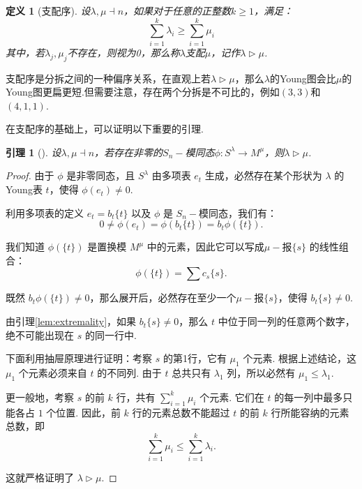 \documentclass{sjtureport}
\newtheorem{lemma}[theorem]{引理}
\newtheorem{definition}{定义}[chapter]
\begin{document}
\begin{definition}[支配序]
    设$\lambda,\mu\dashv n$，如果对于任意的正整数$k\geq 1$，满足：
    \begin{equation*}
        \sum_{i=1}^k\lambda_i\geq \sum_{i=1}^k\mu_i
    \end{equation*}
    其中，若$\lambda_j,\mu_j$不存在，则视为0，那么称$\lambda$支配$\mu$，记作$\lambda \rhd \mu$.
\end{definition}
支配序是分拆之间的一种偏序关系，在直观上若$\lambda\rhd \mu$，那么$\lambda$的Young图会比$\mu$的Young图更扁更短.但需要注意，存在两个分拆是不可比的，例如$(3,3)$和$(4,1,1)$.

在支配序的基础上，可以证明以下重要的引理.

\begin{lemma}[]
    设$\lambda,\mu\dashv n$，若存在非零的$S_n-\!\!$模同态$\phi:S^\lambda\to M^\mu$，则$\lambda\rhd \mu$.
\end{lemma}
\begin{proof}
    由于 $\phi$ 是非零同态，且 $S^\lambda$ 由多项表 $e_t$ 生成，必然存在某个形状为 $\lambda$ 的Young表 $t$，使得 $\phi(e_t) \neq 0$.
    
    利用多项表的定义 $e_t = b_t\{t\}$ 以及 $\phi$ 是 $S_n-\!$模同态，我们有：
    \begin{equation*}
        0 \neq \phi(e_t) = \phi(b_t\{t\}) = b_t\phi(\{t\}).
    \end{equation*}
    
    我们知道 $\phi(\{t\})$ 是置换模 $M^\mu$ 中的元素，因此它可以写成$\mu-\!\!$报$\{s\}$ 的线性组合：
    \begin{equation*}
        \phi(\{t\}) = \sum c_s\{s\}.
    \end{equation*}
    
    既然 $b_t\phi(\{t\}) \neq 0$，那么展开后，必然存在至少一个$\mu-\!\!$报$\{s\}$，使得 $b_t\{s\} \neq 0$.
    
    由引理\ref{lem:extremality}，如果 $b_t\{s\} \neq 0$，那么 $t$ 中位于同一列的任意两个数字，绝不可能出现在 $s$ 的同一行中.
    
    下面利用抽屉原理进行证明：考察 $s$ 的第1行，它有 $\mu_1$ 个元素. 根据上述结论，这 $\mu_1$ 个元素必须来自 $t$ 的不同列. 由于 $t$ 总共只有 $\lambda_1$ 列，所以必然有 $\mu_1 \leq \lambda_1$.
    
    更一般地，考察 $s$ 的前 $k$ 行，共有 $\sum_{i=1}^k \mu_i$ 个元素. 它们在 $t$ 的每一列中最多只能各占 $1$ 个位置. 因此，前 $k$ 行的元素总数不能超过 $t$ 的前 $k$ 行所能容纳的元素总数，即
    \begin{equation*}
        \sum_{i=1}^k \mu_i \leq \sum_{i=1}^k \lambda_i.
    \end{equation*}
    
    这就严格证明了 $\lambda \rhd \mu$.
\end{proof}
\end{document}
